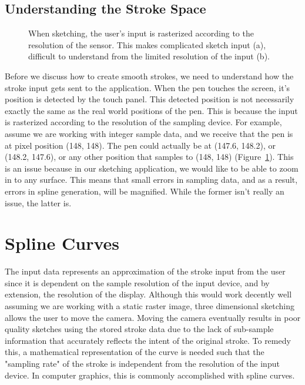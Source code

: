 \subsection{Understanding the Stroke Space}
\label{sec:samplespace}

\begin{figure}
\label{fig:samplestroke}
\centering  
{}
\caption[Sketch intent versus sketch input]{When sketching, the user's input is rasterized according to the resolution of the sensor. This makes complicated sketch input (a), difficult to understand from the limited resolution of the input (b).}
\end{figure}

Before we discuss how to create smooth strokes, we need to understand how the stroke input gets sent to the application.
When the pen touches the screen, it's position is detected by the touch panel.
This detected position is not necessarily exactly the same as the real world positions of the pen.
This is because the input is rasterized according to the resolution of the sampling device.
For example, assume we are working with integer sample data, and we receive that the pen is at pixel position (148, 148).
The pen could actually be at (147.6, 148.2), or (148.2, 147.6), or any other position that samples to (148, 148) (Figure~\ref{fig:samplestroke}).
This is an issue because in our sketching application, we would like to be able to zoom in to any surface.
This means that small errors in sampling data, and as a result, errors in spline generation, will be magnified.
While the former isn't really an issue, the latter is.


\section{Spline Curves}
\label{sec:splines}

The input data represents an approximation of the stroke input from the user since it is dependent on the sample resolution of the input device, and by extension, the resolution of the display.
Although this would work decently well assuming we are working with a static raster image, three dimensional sketching allows the user to move the camera.
Moving the camera eventually results in poor quality sketches using the stored stroke data due to the lack of sub-sample information that accurately reflects the intent of the original stroke.
To remedy this, a mathematical representation of the curve is needed such that the "sampling rate" of the stroke is independent from the resolution of the input device.
In computer graphics, this is commonly accomplished with spline curves.

